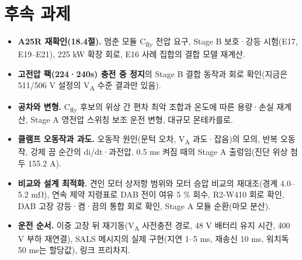 \section{후속 과제}


\begin{itemize}
\item \textbf{A25R 재확인(18.4절).} 멈춘 모듈 C\textsubscript{fly} 전압 요구, Stage B 보호·강등 시험(E17, E19–E21), 225 kW 확장 회로, E16 사례 집합의 결합 모델 재계산.
\item \textbf{고전압 팩(224·240s) 충전 중 정지}의 Stage B 결합 동작과 회로 확인(지금은 511/506 V 설정의 V\textsubscript{A} 수준 결과만 있음).
\item \textbf{공차와 변형.} C\textsubscript{fly} 후보의 위상 간 편차 최악 조합과 온도에 따른 용량·손실 재계산, Stage A 영전압 스위칭 보조 운전 변형, 대규모 몬테카를로.
\item \textbf{클램프 오동작과 과도.} 오동작 원인(문턱 오차, V\textsubscript{A} 과도·잡음)의 모의, 반복 오동작, 강제 끔 순간의 di/dt·과전압, 0.5 ms 켜짐 때의 Stage A 출렁임(진단 위상 첨두 155.2 A).
\item \textbf{비교와 설계 최적화.} 견인 모터 상저항 범위와 모터 승압 비교의 재대조(경계 4.0–5.2 mΩ), 연속 제약 지령표로 DAB 전이 여유 5 \% 회수, R2-W410 회로 확인, DAB 고장 강등·켬·끔의 통합 회로 확인, Stage A 모듈 순환(마모 분산).
\item \textbf{운전 순서.} 이중 고장 뒤 재기동(V\textsubscript{A} 사전충전 경로, 48 V 배터리 유지 시간, 400 V 부하 재연결), SALS 메시지의 실제 구현(지연 1–5 ms, 재송신 10 ms, 워치독 50 ms는 할당값), 링크 프리차지.
\end{itemize}
